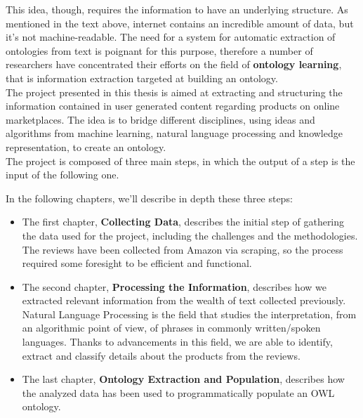 \documentclass[LaM,oneside,binding=0.6cm]{sapthesis}
\begin{document}
\bigskip

This idea, though, requires the information to have an underlying structure. As mentioned in the text above, internet contains an incredible amount of data, but it's not machine-readable. The need for a system for automatic extraction of ontologies from text is poignant for this purpose, therefore a number of researchers have concentrated their efforts on the field of \textbf{ontology learning}, that is information extraction targeted at building an ontology. \\

 The project presented in this thesis is aimed at extracting and structuring the information contained in user generated content regarding products on online marketplaces. The idea is to bridge different disciplines, using ideas and algorithms from machine learning, natural language processing and knowledge representation, to create an ontology. \\

 The project is composed of three main steps, in which the output of a step is the input of the following one.

 \begin{center}
\end{center}

In the following chapters, we'll describe in depth these three steps:
\begin{itemize}
	\item The first chapter, \textbf{Collecting Data}, describes the initial step of gathering the data used for the project, including the challenges and the methodologies. The reviews have been collected from Amazon via scraping, so the process required some foresight to be efficient and functional.
	\item The second chapter, \textbf{Processing the Information}, describes how we extracted relevant information from the wealth of text collected previously. Natural Language Processing is the field that studies the interpretation, from an algorithmic point of view, of phrases in commonly written/spoken languages. Thanks to advancements in this field, we are able to identify, extract and classify details about the products from the reviews.
	\item The last chapter, \textbf{Ontology Extraction and Population}, describes how the analyzed data has been used to programmatically populate an OWL ontology.
\end{itemize}
\end{document}
